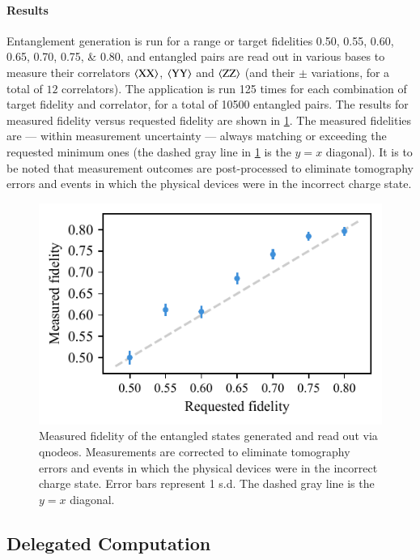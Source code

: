 \paragraph{Results}

Entanglement generation is run for a range or target fidelities \numlist{0.50; 0.55; 0.60; 0.65;
0.70; 0.75; 0.80}, and entangled pairs are read out in various bases to measure their correlators
$\braket{\mathrm{XX}}$, $\braket{\mathrm{YY}}$ and $\braket{\mathrm{ZZ}}$ (and their $\pm$
variations, for a total of $12$ correlators). The application is run \num{125} times for each
combination of target fidelity and correlator, for a total of \num{10500} entangled pairs. The
results for measured fidelity versus requested fidelity are shown in \cref{fig:ent-gen}. The
measured fidelities are --- within measurement uncertainty --- always matching or exceeding the
requested minimum ones (the dashed gray line in \cref{fig:ent-gen} is the $y=x$ diagonal). It is to
be noted that measurement outcomes are post-processed to eliminate tomography errors and events in
which the physical devices were in the incorrect charge state.

\begin{figure}[t]
    \centering
    \includegraphics[width=0.6\linewidth]{figures/ent-gen.pdf}
    \caption{
        Measured fidelity of the entangled states generated and read out via \acrshort{qnodeos}.
        Measurements are corrected to eliminate tomography errors and events in which the physical
        devices were in the incorrect charge state. Error bars represent 1 s.d. The dashed gray line
        is the $y=x$ diagonal.
    }
    \label{fig:ent-gen}
\end{figure}

\subsection{Delegated Computation}

